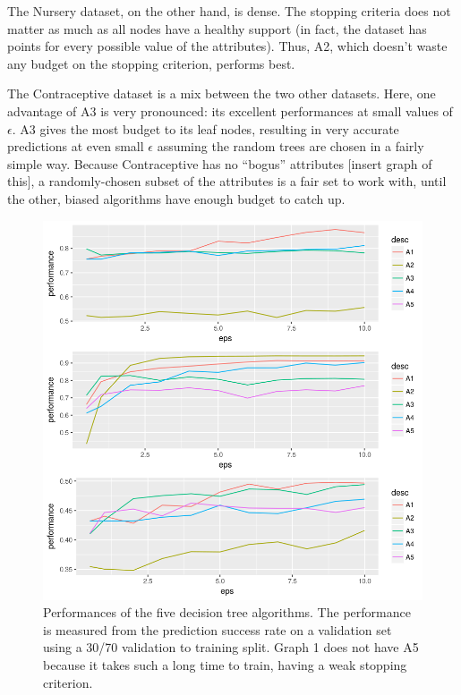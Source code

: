 \documentclass[11pt]{article}
\begin{document}
The Nursery dataset, on the other hand, is dense. The stopping criteria does not matter as much as all nodes have a healthy support (in fact, the dataset has points for every possible value of the attributes). Thus, A2, which doesn't waste any budget on the stopping criterion, performs best.

The Contraceptive dataset is a mix between the two other datasets. Here, one advantage of A3 is very pronounced: its excellent performances at small values of $\epsilon$. A3 gives the most budget to its leaf nodes, resulting in very accurate predictions at even small $\epsilon$ assuming the random trees are chosen in a fairly simple way. Because Contraceptive has no ``bogus'' attributes [insert graph of this], a randomly-chosen subset of the attributes is a fair set to work with, until the other, biased algorithms have enough budget to catch up.
\begin{figure}
\begin{center}
\includegraphics[scale=0.7]{Graph_Performances}
\end{center}
\caption{Performances of the five decision tree algorithms. The performance is measured from the prediction success rate on a validation set using a 30/70 validation to training split. Graph 1 does not have A5 because it takes such a long time to train, having a weak stopping criterion.}
\label{fig:datadep}
\end{figure}
\end{document}
